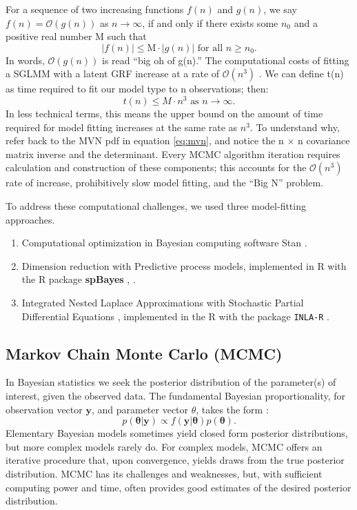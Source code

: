For a sequence of two increasing functions $f(n)$ and $g(n)$, we say $f(n) = \mathcal{O}(g(n))$ as $n \rightarrow \infty$, if and only if there exists some $n_{0}$ and a positive real number M such that
  $$|f(n)| \leq \text{M} \cdot |g(n)| \text{ for all } n \geq n_0. $$
In words, $\mathcal{O}(g(n))$ is read ``big oh of g(n).'' The computational costs of fitting a SGLMM with a latent GRF increase at a rate of $\mathcal{O}(n^{3})$ \citep{Finley2009}. We can define t(n) as time required to fit our model type to n observations; then:
$$t(n) \leq M \cdot n^{3} \text{ as } n \rightarrow \infty.$$
In less technical terms, this means the upper bound on the amount of time required for model fitting increases at the same rate as $n^{3}$. To understand why, refer back to the MVN pdf in equation \ref{eq:mvn}, and notice the n $\times$ n covariance matrix inverse and the determinant. Every MCMC algorithm iteration requires calculation and construction of these components; this accounts for the $\mathcal{O}(n^{3})$ rate of increase, prohibitively slow model fitting, and the ``Big N'' problem. 

To address these computational challenges, we used three model-fitting approaches.
\begin{enumerate}
\item Computational optimization in Bayesian computing software Stan \citep{rstan}.
\item Dimension reduction with Predictive process models, implemented in R with the R package {\bf spBayes} \citep{Eidsvik2012}, \citep{Finley2013}.
\item Integrated Nested Laplace Approximations \citep{Rue2009} with Stochastic Partial Differential Equations \citep{Lindgren2011}, implemented in the R with the package \verb|INLA-R| \citep{Lindgren2015}.
\end{enumerate}

\subsection{Markov Chain Monte Carlo (MCMC)}

In Bayesian statistics we seek the posterior distribution of the parameter(s) of interest, given the observed data. The fundamental Bayesian proportionality, for observation vector $\pmb{y}$, and parameter vector $\theta$, takes the form \citep{Gelman2014}:
\begin{equation} \label{eq:bayes}
p(\pmb{\theta}|\pmb{y}) \propto f(\pmb{y}|\pmb{\theta})p(\pmb{\theta}).
\end{equation}
Elementary Bayesian models sometimes yield closed form posterior distributions, but more complex models rarely do. For complex models, MCMC offers an iterative procedure that, upon convergence, yields draws from the true posterior distribution. MCMC has its challenges and weaknesses, but, with sufficient computing power and time, often provides good estimates of the desired posterior distribution. 

